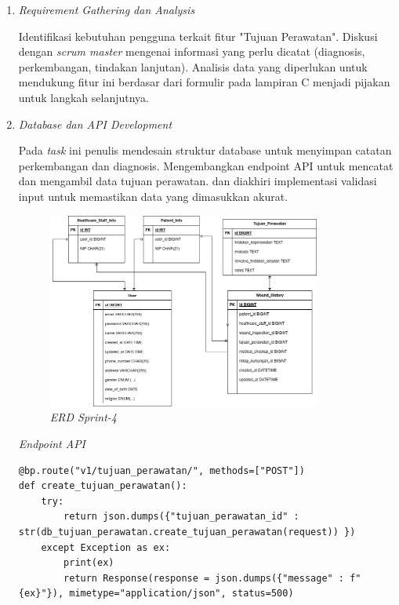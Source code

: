 \begin{enumerate}
\item \textit{Requirement Gathering dan Analysis}

Identifikasi kebutuhan pengguna terkait fitur "Tujuan Perawatan". Diskusi dengan \textit{scrum master} mengenai informasi yang perlu dicatat (diagnosis, perkembangan, tindakan lanjutan). Analisis data yang diperlukan untuk mendukung fitur ini berdasar dari formulir pada lampiran C menjadi pijakan untuk langkah selanjutnya.

\item \textit{Database dan API Development}

Pada \textit{task} ini penulis mendesain struktur database untuk menyimpan catatan perkembangan dan diagnosis. Mengembangkan endpoint API untuk mencatat dan mengambil data tujuan perawatan. dan diakhiri implementasi validasi input untuk memastikan data yang dimasukkan akurat.
	\begin{figure}[H]
		\centering
		\includegraphics[keepaspectratio, width=9cm]{gambar/erd_sprint_4}
		\caption{\textit{ERD Sprint-4}}
		\label{gambar:erd_sprint_4}
	\end{figure}
\textit{Endpoint API}
\begin{lstlisting}
@bp.route("v1/tujuan_perawatan/", methods=["POST"])
def create_tujuan_perawatan():
    try:
        return json.dumps({"tujuan_perawatan_id" : str(db_tujuan_perawatan.create_tujuan_perawatan(request)) })
    except Exception as ex:
        print(ex)
        return Response(response = json.dumps({"message" : f"{ex}"}), mimetype="application/json", status=500)
    

\end{lstlisting}
\end{enumerate}
